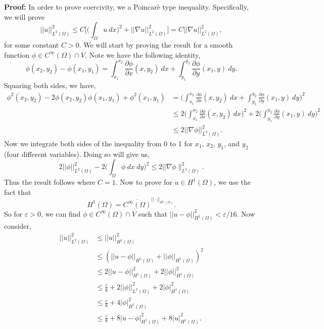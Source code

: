 \documentclass[11pt]{article}
\begin{document}
\textbf{Proof:} In order to prove coercivity, we a Poincar\`{e} type inequality. 
Specifically, we will prove
\begin{equation*}
    ||u||^2_{L^2(\Omega)}  \leq C \Big[ \Big( \int_\Omega u \: dx \Big)^2 + ||\nabla u||^2_{L^2(\Omega)} \Big] = C ||\nabla u||^2_{L^2(\Omega)},
\end{equation*}
for some constant $C>0$. 
We will start by proving the result for a smooth function $\phi \in C^\infty(\Omega) \cap V$.
Note we have the following identity,
\begin{equation*}
    \phi(x_2, y_2) - \phi(x_1, y_1) = \int_{x_1}^{x_2} \frac{\partial \phi}{\partial x}(x,y_2) \: dx + \int_{y_1}^{y_2} \frac{\partial \phi}{\partial y}(x_1, y) \: dy.
\end{equation*}
Squaring both sides, we have,
\begin{align*}
    \phi^2(x_2, y_2) - 2\phi(x_2, y_2) \phi(x_1, y_1) + \phi^2(x_1, y_1)  &= \Big( \int_{x_1}^{x_2} \frac{\partial \phi}{\partial x}(x,y_2) \: dx + \int_{y_1}^{y_2} \frac{\partial \phi}{\partial y}(x_1, y) \: dy \Big)^2 \\
    &\leq 2 \Big( \int_{x_1}^{x_2} \frac{\partial \phi}{\partial x}(x,y_2) \: dx \Big)^2 + 2 \Big( \int_{y_1}^{y_2} \frac{\partial \phi}{\partial y}(x_1,y) \: dy \Big)^2 \\
    &\leq 2||\nabla \phi||^2_{L^2(\Omega)}.
\end{align*}
Now we integrate both sides of the inequality from 0 to 1 for $x_1$, $x_2$, $y_1$, and $y_2$ (four different variables).
Doing so will give us,
\begin{equation*}
    2||\phi||^2_{L^2(\Omega)} - 2\Big( \int_{\Omega} \phi \: dx \: dy \Big)^2 \leq 2 ||\nabla \phi \|^2_{L^2(\Omega)}.
\end{equation*}
Thus the result follows where $C = 1$.
Now to prove for $u \in H^1(\Omega)$, we use the fact that 
\begin{equation*}
    H^1(\Omega) = \overline{C^\infty(\Omega)}^{||\cdot||_{H^1(\Omega)}}.
\end{equation*}
So for $\varepsilon > 0$, we can find $\phi \in C^{\infty}(\Omega) \cap V$ such that $||u - \phi||^2_{H^1(\Omega)} < \varepsilon/16$. 
Now consider,
\begin{align*}
    ||u||^2_{L^2(\Omega)} &\leq ||u||^2_{H^1(\Omega)} \\
    &\leq (||u - \phi||_{H^1(\Omega)} + ||\phi||_{H^1(\Omega)})^2 \\
    &\leq 2||u - \phi||^2_{H^1(\Omega)} + 2||\phi||^2_{H^1(\Omega)} \\
    &\leq \frac{\varepsilon}{8} + 2||\phi||^2_{L^2(\Omega)} + 2 |\phi|^2_{H^1(\Omega)} \\
    &\leq \frac{\varepsilon}{8} + 4 |\phi|^2_{H^1(\Omega)} \\
    &\leq \frac{\varepsilon}{8} + 8|u - \phi|^2_{H^1(\Omega)} + 8 |u|^2_{H^1(\Omega)}.
\end{align*}
\end{document}
